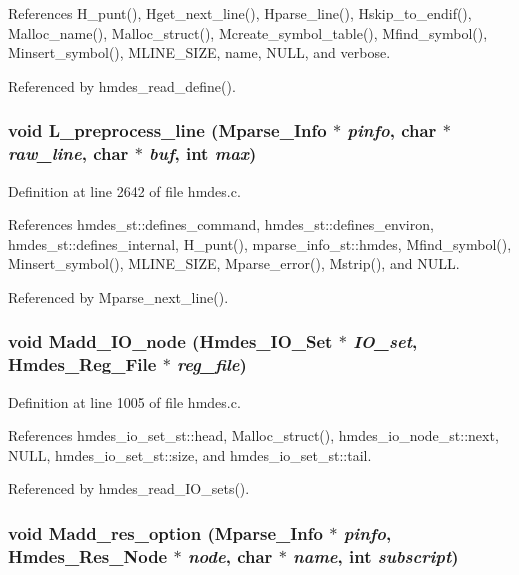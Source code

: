References H\_\-punt(), Hget\_\-next\_\-line(), Hparse\_\-line(), Hskip\_\-to\_\-endif(), Malloc\_\-name(), Malloc\_\-struct(), Mcreate\_\-symbol\_\-table(), Mfind\_\-symbol(), Minsert\_\-symbol(), MLINE\_\-SIZE, name, NULL, and verbose.

Referenced by hmdes\_\-read\_\-define().
\subsubsection{\setlength{\rightskip}{0pt plus 5cm}void L\_\-preprocess\_\-line (\bf{Mparse\_\-Info} $\ast$ {\em pinfo}, char $\ast$ {\em raw\_\-line}, char $\ast$ {\em buf}, int {\em max})}\label{hmdes_8h_9044d5ee723efcef9552470226662186}




Definition at line 2642 of file hmdes.c.

References hmdes\_\-st::defines\_\-command, hmdes\_\-st::defines\_\-environ, hmdes\_\-st::defines\_\-internal, H\_\-punt(), mparse\_\-info\_\-st::hmdes, Mfind\_\-symbol(), Minsert\_\-symbol(), MLINE\_\-SIZE, Mparse\_\-error(), Mstrip(), and NULL.

Referenced by Mparse\_\-next\_\-line().
\subsubsection{\setlength{\rightskip}{0pt plus 5cm}void Madd\_\-IO\_\-node (\bf{Hmdes\_\-IO\_\-Set} $\ast$ {\em IO\_\-set}, \bf{Hmdes\_\-Reg\_\-File} $\ast$ {\em reg\_\-file})}\label{hmdes_8h_8dae87d00a072289aa6110f4a050834f}




Definition at line 1005 of file hmdes.c.

References hmdes\_\-io\_\-set\_\-st::head, Malloc\_\-struct(), hmdes\_\-io\_\-node\_\-st::next, NULL, hmdes\_\-io\_\-set\_\-st::size, and hmdes\_\-io\_\-set\_\-st::tail.

Referenced by hmdes\_\-read\_\-IO\_\-sets().
\subsubsection{\setlength{\rightskip}{0pt plus 5cm}void Madd\_\-res\_\-option (\bf{Mparse\_\-Info} $\ast$ {\em pinfo}, \bf{Hmdes\_\-Res\_\-Node} $\ast$ {\em node}, char $\ast$ {\em name}, int {\em subscript})}\label{hmdes_8h_c44837bb65e6328e99ae414c9ee8499c}




